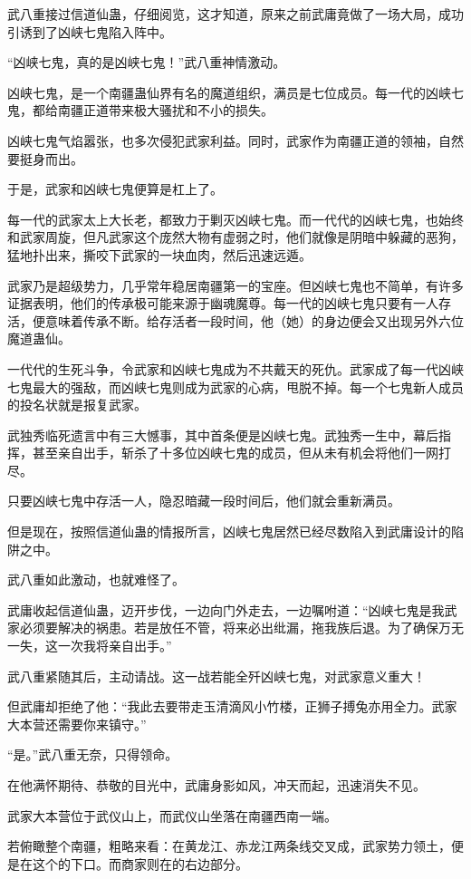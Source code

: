 \begin{this_body}
武八重接过信道仙蛊，仔细阅览，这才知道，原来之前武庸竟做了一场大局，成功引诱到了凶峡七鬼陷入阵中。

“凶峡七鬼，真的是凶峡七鬼！”武八重神情激动。

凶峡七鬼，是一个南疆蛊仙界有名的魔道组织，满员是七位成员。每一代的凶峡七鬼，都给南疆正道带来极大骚扰和不小的损失。

凶峡七鬼气焰嚣张，也多次侵犯武家利益。同时，武家作为南疆正道的领袖，自然要挺身而出。

于是，武家和凶峡七鬼便算是杠上了。

每一代的武家太上大长老，都致力于剿灭凶峡七鬼。而一代代的凶峡七鬼，也始终和武家周旋，但凡武家这个庞然大物有虚弱之时，他们就像是阴暗中躲藏的恶狗，猛地扑出来，撕咬下武家的一块血肉，然后迅速远遁。

武家乃是超级势力，几乎常年稳居南疆第一的宝座。但凶峡七鬼也不简单，有许多证据表明，他们的传承极可能来源于幽魂魔尊。每一代的凶峡七鬼只要有一人存活，便意味着传承不断。给存活者一段时间，他（她）的身边便会又出现另外六位魔道蛊仙。

一代代的生死斗争，令武家和凶峡七鬼成为不共戴天的死仇。武家成了每一代凶峡七鬼最大的强敌，而凶峡七鬼则成为武家的心病，甩脱不掉。每一个七鬼新人成员的投名状就是报复武家。

武独秀临死遗言中有三大憾事，其中首条便是凶峡七鬼。武独秀一生中，幕后指挥，甚至亲自出手，斩杀了十多位凶峡七鬼的成员，但从未有机会将他们一网打尽。

只要凶峡七鬼中存活一人，隐忍暗藏一段时间后，他们就会重新满员。

但是现在，按照信道仙蛊的情报所言，凶峡七鬼居然已经尽数陷入到武庸设计的陷阱之中。

武八重如此激动，也就难怪了。

武庸收起信道仙蛊，迈开步伐，一边向门外走去，一边嘱咐道：“凶峡七鬼是我武家必须要解决的祸患。若是放任不管，将来必出纰漏，拖我族后退。为了确保万无一失，这一次我将亲自出手。”

武八重紧随其后，主动请战。这一战若能全歼凶峡七鬼，对武家意义重大！

但武庸却拒绝了他：“我此去要带走玉清滴风小竹楼，正狮子搏兔亦用全力。武家大本营还需要你来镇守。”

“是。”武八重无奈，只得领命。

在他满怀期待、恭敬的目光中，武庸身影如风，冲天而起，迅速消失不见。

武家大本营位于武仪山上，而武仪山坐落在南疆西南一端。

若俯瞰整个南疆，粗略来看：在黄龙江、赤龙江两条线交叉成\texttimes{}，武家势力领土，便是在这个\texttimes{}的下口。而商家则在\texttimes{}的右边部分。


\end{this_body}
